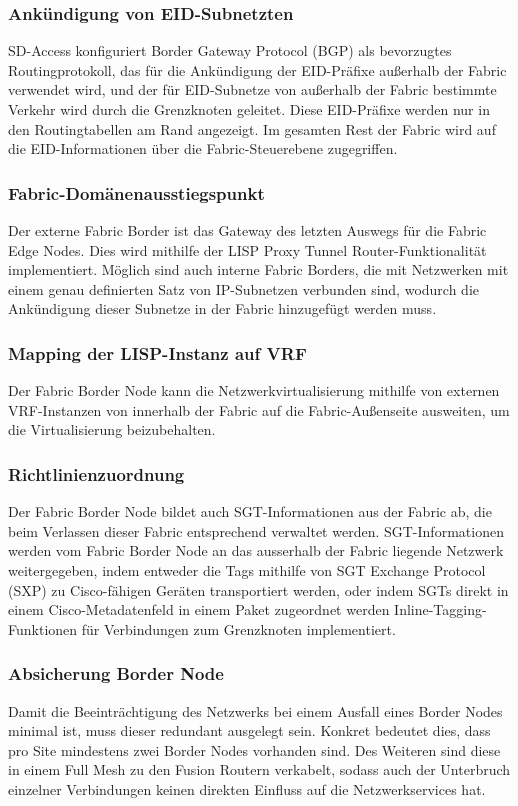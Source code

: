 \subsubsection{Ankündigung von EID-Subnetzten}
SD-Access konfiguriert Border Gateway Protocol (BGP) als bevorzugtes Routingprotokoll, das für die Ankündigung der EID-Präfixe außerhalb der Fabric verwendet wird, und der für EID-Subnetze von außerhalb der Fabric bestimmte Verkehr wird durch die Grenzknoten geleitet. Diese EID-Präfixe werden nur in den Routingtabellen am Rand angezeigt. Im gesamten Rest der Fabric wird auf die EID-Informationen über die Fabric-Steuerebene zugegriffen.

\subsubsection{Fabric-Domänenausstiegspunkt}
Der externe Fabric Border ist das Gateway des letzten Auswegs für die Fabric Edge Nodes. Dies wird mithilfe der LISP Proxy Tunnel Router-Funktionalität implementiert. Möglich sind auch interne Fabric Borders, die mit Netzwerken mit einem genau definierten Satz von IP-Subnetzen verbunden sind, wodurch die Ankündigung dieser Subnetze in der Fabric hinzugefügt werden muss.

\subsubsection{Mapping der LISP-Instanz auf VRF}
Der Fabric Border Node kann die Netzwerkvirtualisierung mithilfe von externen VRF-Instanzen von innerhalb der Fabric auf die Fabric-Außenseite ausweiten, um die Virtualisierung beizubehalten.

\subsubsection{Richtlinienzuordnung}
Der Fabric Border Node bildet auch SGT-Informationen aus der Fabric ab, die beim Verlassen dieser Fabric entsprechend verwaltet werden. SGT-Informationen werden vom Fabric Border Node an das ausserhalb der Fabric liegende Netzwerk weitergegeben, indem entweder die Tags mithilfe von SGT Exchange Protocol (SXP) zu Cisco-fähigen Geräten transportiert werden, oder indem SGTs direkt in einem Cisco-Metadatenfeld in einem Paket zugeordnet werden Inline-Tagging-Funktionen für Verbindungen zum Grenzknoten implementiert.

\subsubsection{Absicherung Border Node}
Damit die Beeinträchtigung des Netzwerks bei einem Ausfall eines Border Nodes minimal ist, muss dieser redundant ausgelegt sein. Konkret bedeutet dies, dass pro Site mindestens zwei Border Nodes vorhanden sind. Des Weiteren sind diese in einem Full Mesh zu den Fusion Routern verkabelt, sodass auch der Unterbruch einzelner Verbindungen keinen direkten Einfluss auf die Netzwerkservices hat.

